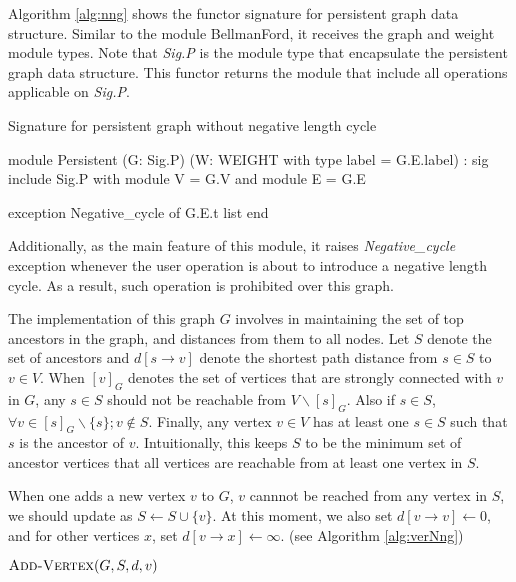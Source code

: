 \documentclass[a4paper,12pt]{article}
\begin{document}
Algorithm \ref{alg:nng} shows the functor signature for persistent
graph data structure. Similar to the module BellmanFord, it receives
the graph and weight module types. Note that \emph{Sig.P} is the
module type that encapsulate the persistent graph data structure. This
functor returns the module that include all operations applicable on
\emph{Sig.P}.

\begin{algorithm}
\caption{Signature for persistent graph without negative length cycle}\label{alg:nng}
\begin{ocaml}
module Persistent
  (G: Sig.P)
  (W: WEIGHT with type label = G.E.label) :
sig
  include Sig.P with module V = G.V and module E = G.E

  exception Negative_cycle of G.E.t list
end
\end{ocaml}
\end{algorithm}

Additionally, as the main feature of this module, it raises
\emph{Negative\_cycle} exception whenever the user operation is about
to introduce a negative length cycle. As a result, such operation is
prohibited over this graph.

The implementation of this graph $G$ involves in maintaining the set
of top ancestors in the graph, and distances from them to all
nodes. Let $S$ denote the set of ancestors and $d[s\to v]$ denote the
shortest path distance from $s\in S$ to $v\in V$. When $[v]_G$ denotes
the set of vertices that are strongly connected with $v$ in $G$, any
$s\in S$ should not be reachable from $V\backslash[s]_G$. Also if
$s\in S$, $\forall v\in[s]_G\backslash\{s\}; v\notin S$. Finally, any
vertex $v\in V$ has at least one $s\in S$ such that $s$ is the
ancestor of $v$. Intuitionally, this keeps $S$ to be the minimum set
of ancestor vertices that all vertices are reachable from at least one
vertex in $S$.

When one adds a new vertex $v$ to $G$, $v$ cannnot be reached from any
vertex in $S$, we should update as $S\leftarrow S\cup\{v\}$. At this
moment, we also set $d[v\to v]\leftarrow 0$, and for other vertices
$x$, set $d[v\to x]\leftarrow \infty$. (see Algorithm
\ref{alg:verNng})

\begin{algorithm}
\caption{$\ensuremath{\mbox{\sc Add-Vertex}}(G,S,d,v)$}\label{alg:verNng}
\begin{algorithmic}[1]
\end{algorithmic}
\end{algorithm}
\end{document}
